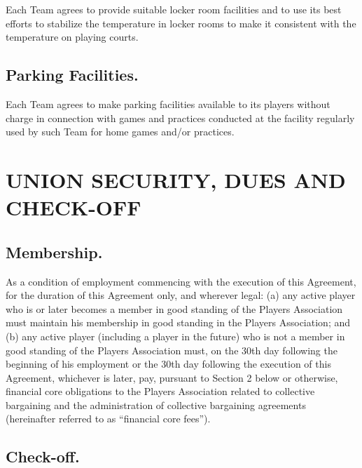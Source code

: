 \documentclass[
]{book}
\begin{document}
Each Team agrees to provide suitable locker room facilities and to use its best efforts to stabilize the temperature in locker rooms to make it consistent with the temperature on playing courts.

\hypertarget{parking-facilities.}{%
\section{Parking Facilities.}\label{parking-facilities.}}

Each Team agrees to make parking facilities available to its players without charge in connection with games and practices conducted at the facility regularly used by such Team for home games and/or practices.

\hypertarget{union-security-dues-and-check-off}{%
\chapter{UNION SECURITY, DUES AND CHECK-OFF}\label{union-security-dues-and-check-off}}

\hypertarget{membership.}{%
\section{Membership.}\label{membership.}}

As a condition of employment commencing with the execution of this Agreement, for the duration of this Agreement only, and wherever legal: (a) any active player who is or later becomes a member in good standing of the Players Association must maintain his membership in good standing in the Players Association; and (b) any active player (including a player in the future) who is not a member in good standing of the Players Association must, on the 30th day following the beginning of his employment or the 30th day following the execution of this Agreement, whichever is later, pay, pursuant to Section 2 below or otherwise, financial core obligations to the Players Association related to collective bargaining and the administration of collective bargaining agreements (hereinafter referred to as ``financial core fees'').

\hypertarget{check-off.}{%
\section{Check-off.}\label{check-off.}}
\end{document}
